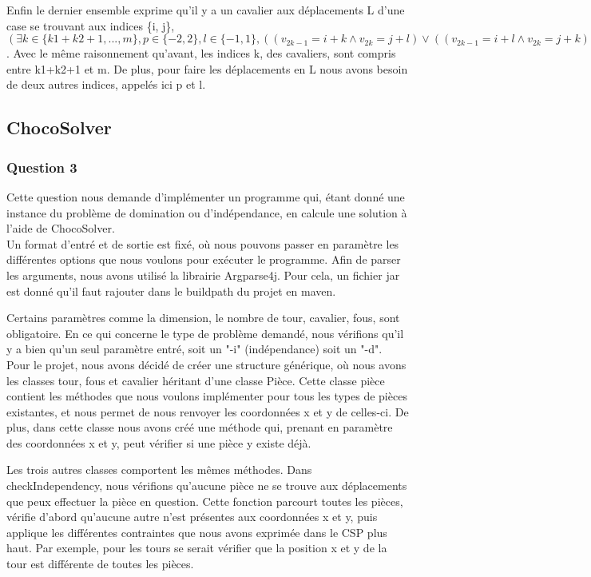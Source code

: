 \documentclass{article}
\begin{document}
Enfin le dernier ensemble exprime qu'il y a un cavalier aux déplacements L d'une case se trouvant aux indices \{i, j\}, $(\exists k \in \{k1+k2+1, ..., m\}, p \in \{-2, 2 \}, l \in \{-1, 1\}, ((v_{2k-1} = i+k \wedge v_{2k} = j+l)  \vee ((v_{2k-1} = i+l \wedge v_{2k} = j+k))))$. Avec le même raisonnement qu'avant, les indices k, des cavaliers, sont compris entre k1+k2+1 et m. De plus, pour faire les déplacements en L nous avons besoin de deux autres indices, appelés ici p et l.

\subsection{ChocoSolver}

\subsubsection{Question 3}
Cette question nous demande d'implémenter un programme qui, étant donné une instance du problème de domination ou d'indépendance, en calcule une solution à l'aide de ChocoSolver.\\

Un format d'entré et de sortie est fixé, où nous pouvons passer en paramètre les différentes options que nous voulons pour exécuter le programme. 
Afin de parser les arguments, nous avons utilisé la librairie Argparse4j. Pour cela, un fichier jar est donné qu'il faut rajouter dans le buildpath du projet en maven. 

Certains paramètres comme la dimension, le nombre de tour, cavalier, fous, sont obligatoire. En ce qui concerne le type de problème demandé, nous vérifions qu'il y a bien qu'un seul paramètre entré, soit un "-i" (indépendance) soit un "-d". \\

Pour le projet, nous avons décidé de créer une structure générique, où nous avons les classes tour, fous et cavalier héritant d'une classe Pièce. 
Cette classe pièce contient les méthodes que nous voulons implémenter pour tous les types de pièces existantes, et nous permet de nous renvoyer les coordonnées x et y de celles-ci. De plus, dans cette classe nous avons créé une méthode qui, prenant en paramètre des coordonnées x et y, peut vérifier si une pièce y existe déjà. 

Les trois autres classes comportent les mêmes méthodes. Dans checkIndependency, nous vérifions qu'aucune pièce ne se trouve aux déplacements que peux effectuer la pièce en question. Cette fonction parcourt toutes les pièces, vérifie d'abord qu'aucune autre n'est présentes aux coordonnées x et y, puis applique les différentes contraintes que nous avons exprimée dans le CSP plus haut. Par exemple, pour les tours se serait vérifier que la position x et y de la tour est différente de toutes les pièces.  
\end{document}
